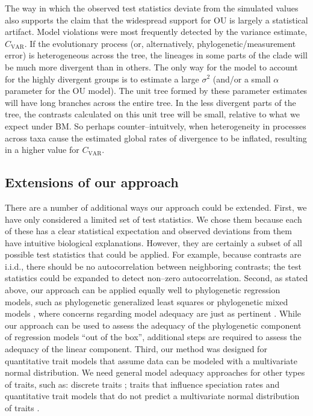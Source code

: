 \documentclass[a4paper,11pt]{article}
\begin{document}
{The way in which the observed test statistics deviate from the simulated values also supports the claim that the widespread support for OU is largely a statistical artifact. Model violations were most frequently detected by the variance estimate, $C_{\text{VAR}}$. If the evolutionary process (or, alternatively, phylogenetic/measurement error) is heterogeneous across the tree, the lineages in some parts of the clade will be much more divergent than in others. The only way for the model to account for the highly divergent groups is to estimate a large $\sigma^2$ (and/or a small $\alpha$ parameter for the OU model). The unit tree formed by these parameter estimates will have long branches across the entire tree. In the less divergent parts of the tree, the contrasts calculated on this unit tree will be small, relative to what we expect under BM. So perhaps counter--intuitvely, when heterogeneity in processes across taxa cause the estimated global rates of divergence to be inflated, resulting in a higher value for $C_{\text{VAR}}$. 

\subsection{Extensions of our approach}

There are a number of additional ways our approach could be extended. First, we have only considered a limited set of test statistics. We chose them because each of these has a clear statistical expectation and observed deviations from them have intuitive biological explanations. However, they are certainly a subset of all possible test statistics that could be applied. 
For example, because contrasts are i.i.d., there should be no autocorrelation between neighboring contrasts; the test statistics could be expanded to detect non--zero autocorrelation. Second, as stated above, our approach can be applied equally well to phylogenetic regression models, such as phylogenetic generalized least squares \citep{Grafen1989, MartinsHansen1997} or phylogenetic mixed models \citep{Lynch1991, Housworth2004, Hadfield2010}, where concerns regarding model adequacy are just as pertinent \citep{Hansen2012}. While our approach can be used to assess the adequacy of the phylogenetic component of regression models ``out of the box'', additional steps are required to assess the adequacy of the linear component.  Third, our method was designed for quantitative trait models that assume data can be modeled with a multivariate normal distribution. We need general model adequacy approaches for other types of traits, such as: discrete traits \citep[i.e., binary, multistate, ordinal; see][for recent discussions of this]{Beaulieu2013, Blackmon2014, MaddisonFitzJohn}; traits that influence speciation rates \citep[e.g.,][]{Maddison2007, FitzJohn2010} and quantitative trait models that do not predict a multivariate normal distribution of traits \citep{Landis2012, Landispreprint}.

}
\end{document}
